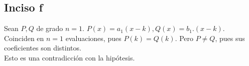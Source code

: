 \documentclass[10pt]{article}
\begin{document}
\subsection{Inciso f}
\begin{prf}{}
	Sean $P, Q$ de grado $n = 1$. $P(x) = a_1(x - k), Q(x) = b_1.(x - k)$.\\
	Coinciden en $n = 1$ evaluaciones, pues $P(k) = Q(k)$. Pero $P \neq Q$, pues sus coeficientes son distintos.\\
	Esto es una contradicción con la hipótesis.
\end{prf}
\end{document}
